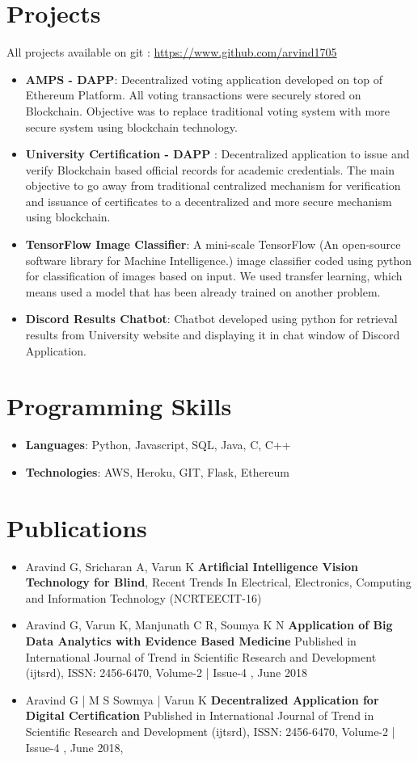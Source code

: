 \documentclass[letterpaper,11pt]{article}
\newcommand{\resumeItem}[2]{
  \item\small{
    \textbf{#1}{: #2 \vspace{-2pt}}
  }
}
\newcommand{\resumeSubItem}[2]{\resumeItem{#1}{#2}\vspace{-4pt}}
\newcommand{\resumeSubHeadingListStart}{\begin{itemize}[leftmargin=*]}
\newcommand{\resumeSubHeadingListEnd}{\end{itemize}}
\begin{document}
\section{Projects} All projects available on git : \url{https://www.github.com/arvind1705}
  \resumeSubHeadingListStart
    \resumeSubItem{AMPS - DAPP}
      {Decentralized voting application developed on top of Ethereum Platform. All voting transactions were securely stored on Blockchain. Objective was to replace traditional voting system with more secure system using blockchain technology. }
    \resumeSubItem{University Certification - DAPP }
      {Decentralized application to issue and verify Blockchain based official records for academic credentials. The main objective to go away from traditional centralized mechanism for verification and issuance of certificates to a decentralized and more secure mechanism using blockchain. }
    \resumeSubItem{TensorFlow Image Classifier}
      {A mini-scale TensorFlow (An open-source software library for
      Machine Intelligence.) image classifier coded using python for classification of images based on
      input. We used transfer learning, which means used a model that has been already trained on
      another problem.}
    \resumeSubItem{Discord Results Chatbot}
      {Chatbot developed using python for retrieval results from University website and displaying it in chat window of Discord Application.}
  \resumeSubHeadingListEnd


\section{Programming Skills}
\resumeSubHeadingListStart
  \item{
    \textbf{Languages}{: Python, Javascript, SQL, Java, C, C++}
  }
  \item {
    \textbf{Technologies}{: AWS,  Heroku, GIT, Flask, Ethereum}
  }
\resumeSubHeadingListEnd

\section{Publications}
 \resumeSubHeadingListStart
   \item{
    Aravind G, Sricharan A, Varun K \textbf{Artificial Intelligence Vision Technology for
    Blind}, Recent Trends In Electrical, Electronics, Computing and
    Information Technology (NCRTEECIT-16)
   }
   \item  Aravind G, Varun K, Manjunath C R, Soumya K N
   \textbf{Application of Big Data Analytics with Evidence Based Medicine}
   Published in International Journal of Trend in Scientific Research and Development (ijtsrd), 
   ISSN: 2456-6470, Volume-2 | Issue-4 , June 2018
   \item Aravind G | M S Sowmya | Varun K 
   \textbf{Decentralized Application for Digital Certification}
   Published in International Journal of Trend in Scientific Research and Development (ijtsrd), 
   ISSN: 2456-6470, Volume-2 | Issue-4 , June 2018, 
   
 \resumeSubHeadingListEnd

 


\end{document}
